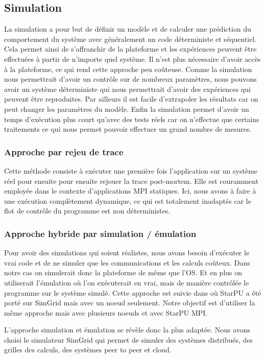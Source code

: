 \documentclass[smallextended]{svjour3}
\begin{document}
\subsection{Simulation}
\label{sec-2-2}
La simulation a pour but de définir un modèle et de calculer une
prédiction du comportement du système avec généralement un code
déterministe et séquentiel. Cela permet ainsi de s'affranchir de la
plateforme et les expériences peuvent être effectuées à partir de
n'importe quel système. Il n'est plus nécessaire d'avoir accès à la
plateforme, ce qui rend cette approche peu coûteuse. Comme la 
simulation nous permettrait d'avoir un contrôle sur de nombreux
paramètres, nous pouvons avoir un système déterministe qui 
nous permettrait d'avoir des expériences qui peuvent être reproduites. 
Par ailleurs il est facile d'extrapoler les résultats car on peut
changer les paramètres du modèle. Enfin la simulation
permet d'avoir un temps d'exécution plus court qu'avec des tests
réels car on n'effectue que certains traitements ce qui nous permet
pouvoir effectuer un grand nombre de mesures.  
\subsubsection{Approche par rejeu de trace}
\label{sec-2-2-1}
Cette méthode consiste à exécuter une première fois l'application
sur un système réel pour ensuite pour ensuite rejouer la trace
post-mortem. Elle est couramment employée dans le contexte 
d'applications MPI statiques. Ici, nous avons à faire à une
exécution complètement dynamique, ce qui est totalement inadaptés car
le flot de contrôle du programme est non déterministes. 
\subsubsection{Approche hybride par simulation / émulation}
\label{sec-2-2-2}
Pour avoir des simulations qui soient réalistes, nous avons besoin
d'exécuter le vrai code et de ne simuler que les communications et
les calculs coûteux. Dans notre cas on simulerait donc la
plateforme de même que l'OS. Et en plus on utiliserait l'émulation
où l'on exécuterait en vrai, mais de manière contrôlée le
programme sur le système simulé. Cette approche est suivie dans
\cite{StarPUSG} où StarPU a été porté sur SimGrid mais avec un
noeud seulement. Notre objectif est d'utiliser la même approche
mais avec plusieurs noeuds et avec StarPU MPI. 

L'approche simulation et émulation se révèle donc la plus adaptée.
Nous avons choisi le simulateur SimGrid qui permet de simuler des
systèmes distribués, des grilles des calculs, des systèmes peer to
peer et cloud. 
\end{document}
